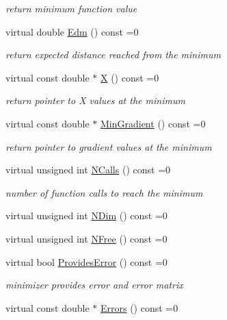 \begin{DoxyCompactItemize}
\begin{DoxyCompactList}\small\item\em return minimum function value \end{DoxyCompactList}\item 
virtual double \mbox{\hyperlink{classROOT_1_1Math_1_1Minimizer_a990c6935849a3fb31aedab1df6c26f28}{Edm}} () const =0
\begin{DoxyCompactList}\small\item\em return expected distance reached from the minimum \end{DoxyCompactList}\item 
virtual const double $\ast$ \mbox{\hyperlink{classROOT_1_1Math_1_1Minimizer_a35c7c2caf54e548f892d84795209edad}{X}} () const =0
\begin{DoxyCompactList}\small\item\em return pointer to X values at the minimum \end{DoxyCompactList}\item 
virtual const double $\ast$ \mbox{\hyperlink{classROOT_1_1Math_1_1Minimizer_a861036d38a21d9a60d44e068397307af}{Min\+Gradient}} () const =0
\begin{DoxyCompactList}\small\item\em return pointer to gradient values at the minimum \end{DoxyCompactList}\item 
virtual unsigned int \mbox{\hyperlink{classROOT_1_1Math_1_1Minimizer_abf8b2e97d47843a1fde7a54cb51c1f0e}{N\+Calls}} () const =0
\begin{DoxyCompactList}\small\item\em number of function calls to reach the minimum \end{DoxyCompactList}\item 
virtual unsigned int \mbox{\hyperlink{classROOT_1_1Math_1_1Minimizer_aecb9b9ee5c6a9fd7db3196ae3ac5e335}{N\+Dim}} () const =0
\item 
virtual unsigned int \mbox{\hyperlink{classROOT_1_1Math_1_1Minimizer_a75a7cd8dc0d764ecc9d82dd8f83aab24}{N\+Free}} () const =0
\item 
virtual bool \mbox{\hyperlink{classROOT_1_1Math_1_1Minimizer_a71837caa295c76303c1a14679be1898d}{Provides\+Error}} () const =0
\begin{DoxyCompactList}\small\item\em minimizer provides error and error matrix \end{DoxyCompactList}\item 
virtual const double $\ast$ \mbox{\hyperlink{classROOT_1_1Math_1_1Minimizer_a42f71e22f16cf4c59b621cf7e1e75f3d}{Errors}} () const =0

\end{DoxyCompactItemize}
